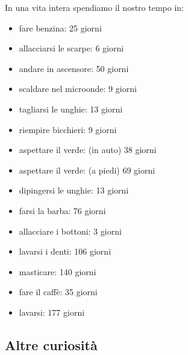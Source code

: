 \documentclass[12pt]{book} %
\begin{document}
\bigskip

In una vita intera spendiamo il nostro tempo in:

\begin{itemize}
\item fare benzina: 25 giorni
\item allacciarsi le scarpe: 6 giorni
\item andare in ascensore: 50 giorni
\item scaldare nel microonde: 9 giorni
\item tagliarsi le unghie: 13 giorni
\item riempire bicchieri: 9 giorni
\item aspettare il verde: (in auto) 38 giorni
\item aspettare il verde: (a piedi) 69 giorni
\item dipingersi le unghie: 13 giorni
\item farsi la barba: 76 giorni
\item allacciare i bottoni: 3 giorni
\item lavarsi i denti: 106 giorni
\item masticare: 140 giorni
\item fare il caffè: 35 giorni
\item lavarsi: 177 giorni
\end{itemize}

\bigskip

\subsection{Altre curiosità}

\bigskip
\end{document}
